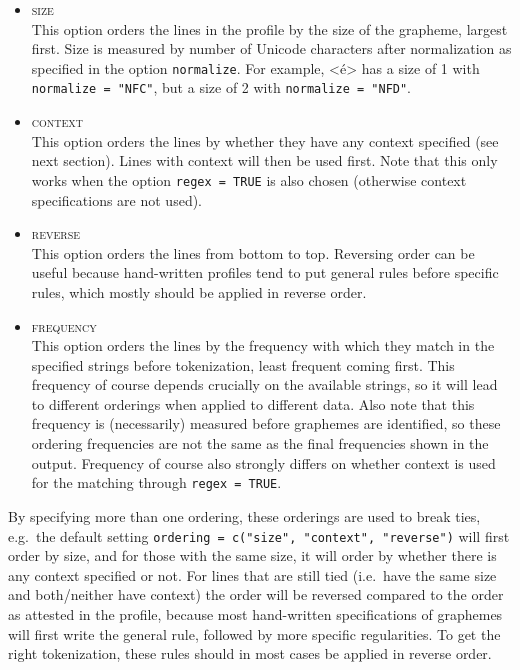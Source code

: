 \documentclass[output=book,nonflat,modfonts,
citecolor=brown,
		]{langsci/langscibook}\usepackage[]{graphicx}\usepackage[]{color}
\begin{document}
\begin{itemize}
  
   \item \textsc{size}\\
         This option orders the lines in the profile by the size of the
         grapheme, largest first. Size is measured by number of Unicode
         characters after normalization as specified in the option
         \texttt{normalize}. For example, <é> has a size of 1 with
         \texttt{normalize = "NFC"}, but a size of 2 with
         \texttt{normalize = "NFD"}.

   \item \textsc{context}\\ This option orders the lines by whether they have
           any context specified (see next section). Lines with context will
           then be used first. Note that this only works when the option
           \texttt{regex = TRUE} is also chosen (otherwise context
           specifications are not used).

   \item \textsc{reverse}\\ This option orders the lines from bottom to top.
         Reversing order can be useful because hand-written profiles tend to put
         general rules before specific rules, which mostly should be applied in
         reverse order.

  \item \textsc{frequency}\\
         This option orders the lines by the frequency with which they
         match in the specified strings before tokenization, least frequent
         coming first. This frequency of course depends crucially on the
         available strings, so it will lead to different orderings when applied
         to different data. Also note that this frequency is (necessarily)
         measured before graphemes are identified, so these ordering frequencies
         are not the same as the final frequencies shown in the output.
         Frequency of course also strongly differs on whether context is used
         for the matching through \texttt{regex = TRUE}.
  
\end{itemize}

By specifying more than one ordering, these orderings are used to break ties,
e.g.\ the default setting \texttt{ordering = c("size", "context", "reverse")}
will first order by size, and for those with the same size, it will order by
whether there is any context specified or not. For lines that are still tied
(i.e.\ have the same size and both/neither have context) the order will be
reversed compared to the order as attested in the profile, because most
hand-written specifications of graphemes will first write the general rule,
followed by more specific regularities. To get the right tokenization, these 
rules should in most cases be applied in reverse order.
\end{document}
